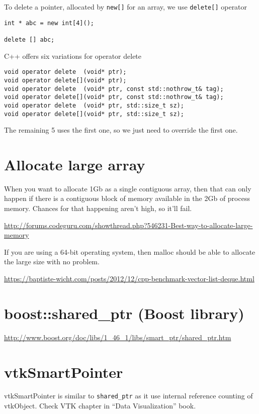 To delete a pointer, allocated by \verb!new[]! for an array, we use
\verb!delete[]! operator
\begin{verbatim}
int * abc = new int[4]();

delete [] abc;
\end{verbatim}


C++ offers six variations for operator delete
\begin{lstlisting}
void operator delete  (void* ptr); 	
void operator delete[](void* ptr);
void operator delete  (void* ptr, const std::nothrow_t& tag);
void operator delete[](void* ptr, const std::nothrow_t& tag);
void operator delete  (void* ptr, std::size_t sz);
void operator delete[](void* ptr, std::size_t sz);
\end{lstlisting}
The remaining 5 uses the first one, so we just need to override the first one.


\section{Allocate large array}



When you want to allocate 1Gb as a single contiguous array, then that can only
happen if there is a contiguous block of memory available in the 2Gb of process
memory. Chances for that happening aren't high, so it'll fail.

\url{http://forums.codeguru.com/showthread.php?546231-Best-way-to-allocate-large-memory}

If you are using a 64-bit operating system, then malloc should be able to
allocate the large size with no problem.


\url{https://baptiste-wicht.com/posts/2012/12/cpp-benchmark-vector-list-deque.html}



\section{boost::shared\_ptr (Boost library)}

\url{http://www.boost.org/doc/libs/1_46_1/libs/smart_ptr/shared_ptr.htm}


\section{vtkSmartPointer}

vtkSmartPointer is similar to \verb!shared_ptr! as it use internal reference
counting of vtkObject. Check VTK chapter in ``Data Visualization'' book.


